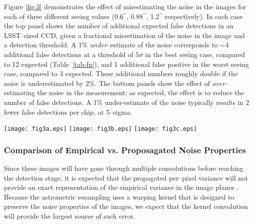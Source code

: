 \documentclass[iop]{emulateapj}
\begin{document}
Figure \ref{fig:3} demonstrates the effect of misestimating the noise in the images for each of three different seeing values (0.6$^{\prime\prime}$, 0.88$^{\prime\prime}$, 1.2$^{\prime\prime}$ respectively).
In each case the top panel shows the number of additional expected false detections in an LSST--sized CCD, given a fractional misestimation of the noise in the image and a detection threshold.
A 1\% {\it under}--estimate of the noise corresponds to $\sim 4$ additional false detections at a threshold of $5\sigma$ in the best seeing case, compared to 12 expected (Table~\ref{tab-fp}), and 1 additional false positive in the worst seeing case, compared to 3 expected.
These additional numbers roughly double if the noise is underestimated by 2\%.
The bottom panels show the effect of {\it over}--estimating the noise in the measurement; as expected, the effect is to reduce the number of false detections.
A 1\% under-estimate of the noise typically results in 2 fewer false detections per chip, at 5--sigma.
\begin{figure*}[!ht]
  \texttt{[image: fig3a.eps]}
  \texttt{[image: fig3b.eps]}
  \texttt{[image: fig3c.eps]} \\
  \caption[]{ We plot here the expected additive change in the total number of false detections as a function of detection threshold and noise misestimate.
    The panels are for three values of image seeing, left--to--right 0.6'', 0.88'', and 1.2''.
    In each panel the top pane shows the rate increase when the noise is under--estimated, and the bottom shows the rate decrease when the noise is over--estimated.
    In all cases the counts are for the total number of false detections in a single 4000x4072--pixel random Gaussian field.
  }
  \label{fig:3}
\end{figure*} 

\subsubsection{Comparison of Empirical vs. Proposagated Noise Properties}



Since these images will have gone through multiple convolutions before reaching the detection stage, it is expected that the propagated per--pixel variance will not provide an exact representation of the empirical variance in the image planes \citep{Price-Stacking}.
Because the astrometric resampling uses a warping kernel that is designed to preserve the noise properties of the images, we expect that the kernel convolution will provide the largest source of such error.
\end{document}
